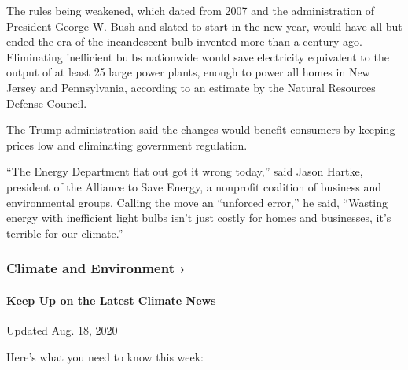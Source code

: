 The rules being weakened, which dated from 2007 and the administration
of President George W. Bush and slated to start in the new year, would
have all but ended the era of the incandescent bulb invented more than a
century ago. Eliminating inefficient bulbs nationwide would save
electricity equivalent to the output of at least 25 large power plants,
enough to power all homes in New Jersey and Pennsylvania, according to
an estimate by the Natural Resources Defense Council.

The Trump administration said the changes would benefit consumers by
keeping prices low and eliminating government regulation.

``The Energy Department flat out got it wrong today,'' said Jason
Hartke, president of the Alliance to Save Energy, a nonprofit coalition
of business and environmental groups. Calling the move an ``unforced
error,'' he said, ``Wasting energy with inefficient light bulbs isn't
just costly for homes and businesses, it's terrible for our climate.''

\href{https://www.nytimes3xbfgragh.onion/section/climate?action=click\&pgtype=Article\&state=default\&region=MAIN_CONTENT_1\&context=storylines_keepup}{}

\hypertarget{climate-and-environment-}{%
\subsubsection{Climate and Environment
›}\label{climate-and-environment-}}

\hypertarget{keep-up-on-the-latest-climate-news}{%
\paragraph{Keep Up on the Latest Climate
News}\label{keep-up-on-the-latest-climate-news}}

Updated Aug. 18, 2020

Here's what you need to know this week:

